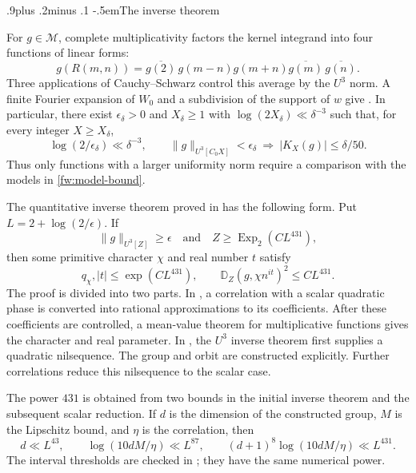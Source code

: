 \documentclass[twoside]{aomart}
\makeatletter
\theoremstyle{paperplain}
\theoremstyle{paperdefinition}
\renewcommand\subsection{\@startsection{subsection}{2}{\z@}
  {.9\baselineskip plus .2\baselineskip minus .1\baselineskip}
  {-.5em}{\normalfont\bfseries}}
\newcommand{\Exp}{\operatorname{Exp}}
\numberwithin{equation}{section}
\makeatother
\begin{document}
\subsection{The inverse theorem}

For $g\in\mathcal M$, complete multiplicativity factors the kernel
integrand into four functions of linear forms:
\begin{equation}
 g(R(m,n))=\overline{g(2)}\,
 g(m-n)g(m+n)\overline{g(m)}\,\overline{g(n)}.
 \label{fw:four-forms}
\end{equation}
Three applications of Cauchy--Schwarz control this average by the
$U^3$ norm. A finite Fourier expansion of $W_0$ and a subdivision
of the support of $w$ give . In particular,
there exist $\epsilon_\delta>0$ and $X_\delta\ge1$ with
$\log(2X_\delta)\ll\delta^{-3}$ such that, for every integer
$X\ge X_\delta$,
\begin{equation}
 \log(2/\epsilon_\delta)\ll\delta^{-3},\qquad
 \|g\|_{U^3[C_0X]}<\epsilon_\delta
 \ \Longrightarrow\ |K_X(g)|\le\delta/50.
 \label{fw:uniform-alternative}
\end{equation}
Thus only functions with a larger uniformity norm require a
comparison with the models in \eqref{fw:model-bound}.

The quantitative inverse theorem proved in  has
the following form. Put $L=2+\log(2/\epsilon)$. If
$$\|g\|_{U^3[Z]}\ge\epsilon\quad\text{and}\quad 
Z\ge\Exp_2(CL^{431}),$$ then some primitive character $\chi$ and
real number $t$ satisfy
\begin{equation}
 q_\chi,|t|\le\exp(CL^{431}),\qquad
 \mathbb D_Z(g,\chi n^{it})^2\le CL^{431}.
 \label{fw:inverse-output}
\end{equation}
The proof is divided into two parts. In , a
correlation with a scalar quadratic phase is converted into
rational approximations to its coefficients. After these
coefficients are controlled, a mean-value theorem for multiplicative
functions gives the character and real parameter. In
, the $U^3$ inverse theorem first supplies a
quadratic nilsequence. The group and orbit are constructed explicitly.
Further correlations reduce this nilsequence to the scalar case.

The power $431$ is obtained from two bounds in the initial inverse
theorem and the subsequent scalar reduction. If $d$ is the dimension
of the constructed group, $M$ is the Lipschitz bound, and $\eta$ is
the correlation, then
\begin{equation*}
 d\ll L^{43},\qquad
 \log(10dM/\eta)\ll L^{87},\qquad
 (d+1)^8\log(10dM/\eta)\ll L^{431}.
\end{equation*}
The interval thresholds are checked in
; they have the same numerical power.
\end{document}
